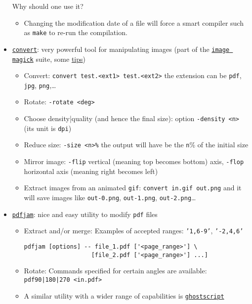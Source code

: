 \documentclass[a4paper,12pt,%
              final%
              ]{article}
\begin{document}
\begin{itemize}
  Why should one use it?
    \begin{itemize}
      \item Changing the modification date of a file will force a smart compiler such as \verb|make| to re-run the compilation.
    \end{itemize}
  \item \href{http://www.imagemagick.org/script/convert.php}{\texttt{convert}}: very powerful tool for manipulating images (part of the \href{https://imagemagick.org/index.php}{\texttt{image magick}} suite, some \href{http://www.imagemagick.org/script/command-line-processing.php}{tips})
    \begin{itemize}
      \item Convert: \verb|convert test.<ext1> test.<ext2>| the extension can be \texttt{pdf}, \texttt{jpg}, \texttt{png},\ldots
      \item Rotate: \verb|-rotate <deg>|
      \item Choose density|quality (and hence the final size): option \verb|-density <n>| (its unit is \texttt{dpi})
      \item Reduce size: \verb|-size <n>%| the output will have be the \verb|n|\% of the initial size
      \item Mirror image: \verb|-flip| vertical (meaning top becomes bottom) axis, \verb|-flop| horizontal axis (meaning right becomes left)
      \item Extract images from an animated \texttt{gif}: \verb|convert in.gif out.png| and it will save images like \texttt{out-0.png}, \texttt{out-1.png}, \texttt{out-2.png}\ldots
    \end{itemize}
  \item \href{https://github.com/DavidFirth/pdfjam#using}{\texttt{pdfjam}}: nice and easy utility to modify \texttt{pdf} files
    \begin{itemize}
      \item Extract and/or merge: Examples of accepted ranges: \texttt{'1,6-9'}, \texttt{'-2,4,6'}
\begin{verbatim}
pdfjam [options] -- file_1.pdf ['<page_range>'] \
                   [file_2.pdf ['<page_range>'] ...]
\end{verbatim}
      \item Rotate: Commands specified for certain angles are available: \verb!pdf90|180|270 <in.pdf>!
      \item A similar utility with a wider range of capabilities is \href{https://www.ghostscript.com/doc/current/Use.htm}{\texttt{ghostscript}}

\end{itemize}
\end{itemize}
\end{document}
